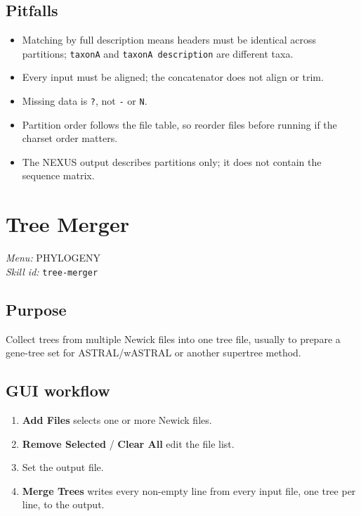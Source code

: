\documentclass[11pt]{report}
\begin{document}
\subsection{Pitfalls}

\begin{itemize}
  \item Matching by full description means headers must be identical across partitions; \texttt{taxonA} and \texttt{taxonA description} are different taxa.
  \item Every input must be aligned; the concatenator does not align or trim.
  \item Missing data is \texttt{?}, not \texttt{-} or \texttt{N}.
  \item Partition order follows the file table, so reorder files before running if the charset order matters.
  \item The NEXUS output describes partitions only; it does not contain the sequence matrix.
\end{itemize}


\section{Tree Merger}
\noindent\textit{Menu:} PHYLOGENY\\
\noindent\textit{Skill id:} \texttt{tree-merger}

\subsection{Purpose}

Collect trees from multiple Newick files into one tree file, usually to prepare a gene-tree set for ASTRAL/wASTRAL or another supertree method.

\subsection{GUI workflow}

\begin{enumerate}
  \item \textbf{Add Files} selects one or more Newick files.
  \item \textbf{Remove Selected} / \textbf{Clear All} edit the file list.
  \item Set the output file.
  \item \textbf{Merge Trees} writes every non-empty line from every input file, one tree per line, to the output.
\end{enumerate}
\end{document}
